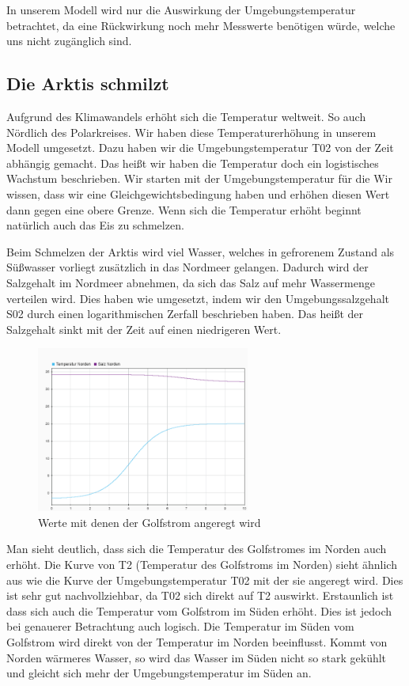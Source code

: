 \documentclass[a4paper,twoside]{article}
\begin{document}
	In unserem Modell wird nur die Auswirkung der Umgebungstemperatur betrachtet, da eine Rückwirkung noch mehr Messwerte benötigen würde, welche uns nicht zugänglich sind.  
	

	\subsection{Die Arktis schmilzt} \label{dieArktisSchmilzt}
	
	Aufgrund des Klimawandels erhöht sich die Temperatur weltweit. So auch Nördlich des Polarkreises. Wir haben diese Temperaturerhöhung in unserem Modell umgesetzt. Dazu haben wir die Umgebungstemperatur T02 von der Zeit abhängig gemacht. Das heißt wir haben die Temperatur doch ein logistisches Wachstum beschrieben. Wir starten mit der Umgebungstemperatur für die Wir wissen, dass wir eine Gleichgewichtsbedingung haben und erhöhen diesen Wert dann gegen eine obere Grenze. Wenn sich die Temperatur erhöht beginnt natürlich auch das Eis zu schmelzen.
		
	Beim Schmelzen der Arktis wird viel Wasser, welches in gefrorenem Zustand als Süßwasser vorliegt zusätzlich in das Nordmeer gelangen. Dadurch wird der Salzgehalt im Nordmeer abnehmen, da sich das Salz auf mehr Wassermenge verteilen wird. Dies haben wie umgesetzt, indem wir den Umgebungssalzgehalt S02 durch einen logarithmischen Zerfall beschrieben haben. Das heißt der Salzgehalt sinkt mit der Zeit auf einen niedrigeren Wert. 
	
	\begin{figure}[!h]
  		\centering
 		\includegraphics[width=7cm]{../Diagramme/Arktis_schmilzt_init.png}
  		\caption{Werte mit denen der Golfstrom angeregt wird}
  		\label{fig:schmilztUmgebung}
	\end{figure}

	Man sieht deutlich, dass sich die Temperatur des Golfstromes im Norden auch erhöht. Die Kurve von T2 (Temperatur des Golfstroms im Norden) sieht ähnlich aus wie die Kurve der Umgebungstemperatur T02 mit der sie angeregt wird. Dies ist sehr gut nachvollziehbar, da T02 sich direkt auf T2 auswirkt. Erstaunlich ist dass sich auch die Temperatur vom Golfstrom im Süden erhöht. Dies ist jedoch bei genauerer Betrachtung auch logisch. Die Temperatur im Süden vom Golfstrom wird direkt von der Temperatur im Norden beeinflusst. Kommt von Norden wärmeres Wasser, so wird das Wasser im Süden nicht so stark gekühlt und gleicht sich mehr der Umgebungstemperatur im Süden an.
	
\end{document}
